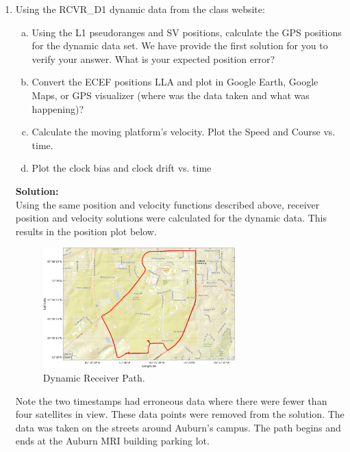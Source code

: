 \documentclass[11pt]{article}
\newcommand{\solution}{\textbf{Solution: \\}}
\begin{document}
\begin{enumerate}[label=\textbf{\arabic*.}]
  \item Using the RCVR\_D1 dynamic data from the class website:
  \begin{enumerate}[(a)]
    \itemsep -2pt
    \item Using the L1 pseudoranges and SV positions, calculate the GPS positions for the
    dynamic data set. We have provide the first solution for you to verify your answer. What
    is your expected position error?
    \item Convert the ECEF positions LLA and plot in Google Earth, Google Maps, or GPS
    visualizer (where was the data taken and what was happening)?
    \item Calculate the moving platform’s velocity. Plot the Speed and Course vs. time.
    \item Plot the clock bias and clock drift vs. time
  \end{enumerate}
  \solution
  Using the same position and velocity functions described above, receiver 
  position and velocity solutions were calculated for the dynamic data. This 
  results in the position plot below.
   \begin{figure}[H]
    \centering
    \includegraphics[width=0.7\textwidth]{dynamic_pos.png}
    \caption{Dynamic Receiver Path.}
  \end{figure}
  Note the two timestamps had erroneous data where there were fewer than four 
  satellites in view. These data points were removed from the solution. 
  The data was taken on the streets around Auburn's campus. The path begins 
  and ends at the Auburn MRI building parking lot.\\


\end{enumerate}
\end{document}

